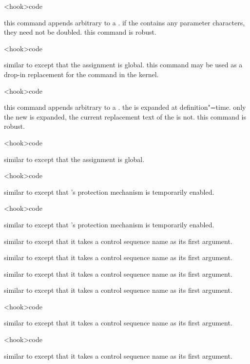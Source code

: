 \begin{ltxsyntax}

<hook>{code}

this command appends arbitrary  to a . if the  contains any parameter characters, they need not be doubled. this command is robust.

<hook>{code}

similar to  except that the assignment is global. this command may be used as a drop-in replacement for the  command in the \latex kernel.

<hook>{code}

this command appends arbitrary  to a . the  is expanded at definition"=time. only the new  is expanded, the current replacement text of the  is not. this command is robust.

<hook>{code}

similar to  except that the assignment is global.

<hook>{code}

similar to  except that \latex's protection mechanism is temporarily enabled.

<hook>{code}

similar to  except that \latex's protection mechanism is temporarily enabled.


similar to  except that it takes a control sequence name as its first argument.


similar to  except that it takes a control sequence name as its first argument.


similar to  except that it takes a control sequence name as its first argument.


similar to  except that it takes a control sequence name as its first argument.

<hook>{code}

similar to  except that it takes a control sequence name as its first argument.

<hook>{code}

similar to  except that it takes a control sequence name as its first argument.

\end{ltxsyntax}

